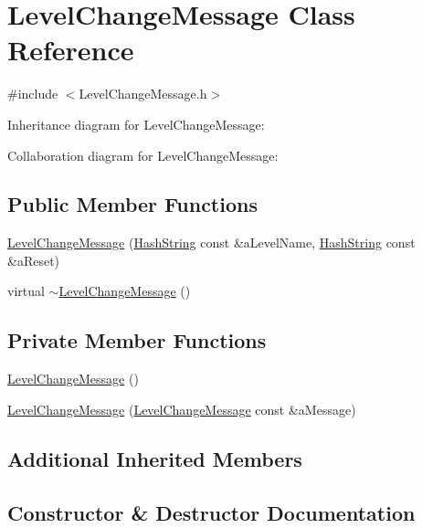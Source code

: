 \hypertarget{classLevelChangeMessage}{}\section{Level\+Change\+Message Class Reference}
\label{classLevelChangeMessage}


{\ttfamily \#include $<$Level\+Change\+Message.\+h$>$}



Inheritance diagram for Level\+Change\+Message\+:


Collaboration diagram for Level\+Change\+Message\+:
\subsection*{Public Member Functions}
\begin{DoxyCompactItemize}
\item 
\hyperlink{classLevelChangeMessage_aedfc42f4d218b3f5a85e9c6f134e8903}{Level\+Change\+Message} (\hyperlink{classHashString}{Hash\+String} const \&a\+Level\+Name, \hyperlink{classHashString}{Hash\+String} const \&a\+Reset)
\item 
virtual \hyperlink{classLevelChangeMessage_af7144f9b7882e5541d2fb3dc85b4e465}{$\sim$\+Level\+Change\+Message} ()
\end{DoxyCompactItemize}
\subsection*{Private Member Functions}
\begin{DoxyCompactItemize}
\item 
\hyperlink{classLevelChangeMessage_a4bcc502c667846f3067d1c28c00e0ba0}{Level\+Change\+Message} ()
\item 
\hyperlink{classLevelChangeMessage_a03cc5bfa2a3dba5dbead657f27bb2767}{Level\+Change\+Message} (\hyperlink{classLevelChangeMessage}{Level\+Change\+Message} const \&a\+Message)
\end{DoxyCompactItemize}
\subsection*{Additional Inherited Members}


\subsection{Constructor \& Destructor Documentation}
